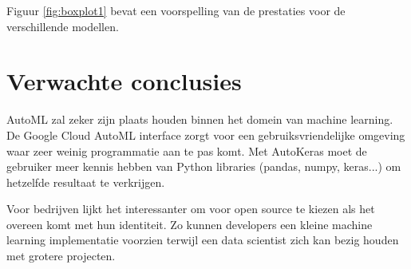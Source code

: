 Figuur \ref{fig:boxplot1} bevat een voorspelling van de prestaties voor de verschillende modellen.

\section{Verwachte conclusies}
\label{sec:verwachte_conclusies}

AutoML zal zeker zijn plaats houden binnen het domein van machine learning. De Google Cloud AutoML interface zorgt voor een gebruiksvriendelijke omgeving waar zeer weinig programmatie aan te pas komt. Met AutoKeras moet de gebruiker meer kennis hebben van Python libraries (pandas, numpy, keras...) om hetzelfde resultaat te verkrijgen. 

Voor bedrijven lijkt het interessanter om voor open source te kiezen als het overeen komt met hun identiteit. Zo kunnen developers een kleine machine learning implementatie voorzien terwijl een data scientist zich kan bezig houden met grotere projecten.

